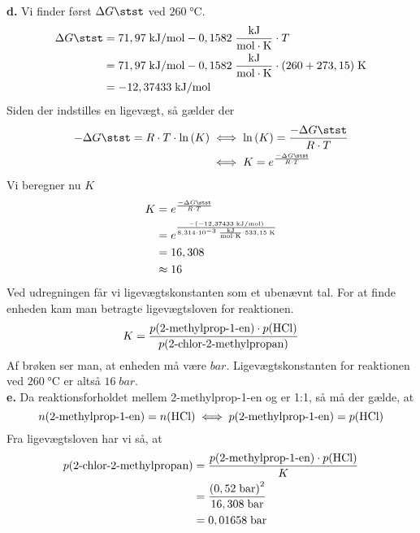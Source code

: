 \documentclass{report}
\begin{document}
\textbf{d.}
Vi finder først $\Delta G \stst$ ved $260 \;\unit{\celsius} $. 
\begin{equation*}
\begin{split}
  \Delta G \stst&=71,97 \;\unit{kJ/mol} -0,1582 \;\unit{\frac{kJ}{mol \cdot K}} \cdot T\\
  &=71,97 \;\unit{kJ/mol} -0,1582 \;\unit{\frac{kJ}{mol \cdot K}} \cdot (260 + 273,15) \;\unit{K} \\
  &=-12,37433 \;\unit{kJ/mol} 
\end{split}
\end{equation*}
Siden der indstilles en ligevægt, så gælder der
\begin{equation*}
\begin{split}
  -\Delta G\stst=R \cdot T \cdot \ln\left(K\right) &\iff \ln\left(K\right) = \frac{-\Delta G \stst}{R \cdot T}\\
  &\iff K=e^{\frac{-\Delta G\stst}{R \cdot T}} 
\end{split}
\end{equation*}
Vi beregner nu $K$
\begin{equation*}
\begin{split}
  K&=e^{\frac{-\Delta G\stst}{R \cdot T}} \\
  &=e^{\frac{-(-12,37433 \;\unit{kJ/mol}) }{8,314 \cdot 10^{-3} \;\unit{\frac{kJ}{mol \cdot K}}  \cdot 533,15 \;\unit{K} }} \\
  &=16,308\\
  &\approx 16
\end{split}
\end{equation*}
Ved udregningen får vi ligevægtskonstanten som et ubenævnt tal.
For at finde enheden kam man betragte ligevægtsloven for reaktionen.
\[
K=\frac{p(\text{2-methylprop-1-en})\cdot p(\ce{HCl} )}{p(\text{2-chlor-2-methylpropan})}
\] 
Af brøken ser man, at enheden må være $\unit{bar} $.
Ligevægtskonstanten for reaktionen ved $260 \;\unit{\celsius} $ er altså $16 \;\unit{bar} $.\\[1ex]
\textbf{e.}
Da reaktionsforholdet mellem 2-methylprop-1-en og  er 1:1, så må der gælde, at
\[
n(\text{2-methylprop-1-en} )=n(\ce{HCl} ) \iff p(\text{2-methylprop-1-en} )=p(\ce{HCl}) 
\] 
Fra ligevægtsloven har vi så, at
\begin{equation*}
\begin{split}
  p(\text{2-chlor-2-methylpropan} )&=\frac{p(\text{2-methylprop-1-en})\cdot p(\ce{HCl} )}{K}\\
  &=\frac{\left(0,52 \;\unit{bar} \right)^2}{16,308 \;\unit{bar} }\\
  &=0,01658 \;\unit{bar} 
\end{split}
\end{equation*}
\end{document}
